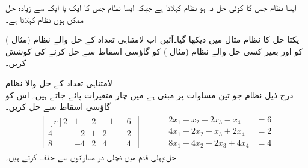 ایسا نظام جس کا کوئی حل نہ ہو  نظام کہلاتا ہے جبکہ ایسا نظام جس کا ایک یا ایک سے زیادہ حل ممکن ہوں  نظام کہلاتا ہے۔

یکتا حل کا نظام مثال  میں دیکھا گیا۔آئیں اب لامتناہی تعداد کے حل والے نظام (مثال ) کو اور بغیر کسی حل والے نظام (مثال ) کو گاؤسی اسقاط سے حل کرنے کی کوشش کریں۔   

\quad لامتناہی تعداد کے حل والا نظام\\
درج ذیل نظام جو تین مساوات پر مبنی ہے میں چار متغیرات پائے جاتے ہیں۔ اس کو گاؤسی اسقاط سے حل کریں۔
\begin{gather*}
\begin{bmatrix*}[r]2&1&2&-1&&6\\4&-2&1&2&&2\\8&-4&2&4&&4  \end{bmatrix*}\quad\quad \quad
\begin{aligned}
2x_1+x_2+2x_3-x_4&=6\\
4x_1-2x_2+x_3+2x_4&=2\\
8x_1-4x_2+2x_3+4x_4&=4
\end{aligned}
\end{gather*}
حل:پہلی قدم میں نچلی دو مساواتوں سے  حذف کرتے ہیں۔

